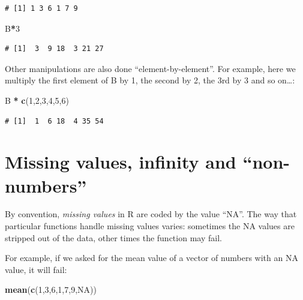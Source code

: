 \documentclass[
  a4paperpaper,
]{book}
\newenvironment{Shaded}{\begin{snugshade}}{\end{snugshade}}
\newcommand{\DecValTok}[1]{\textcolor[rgb]{0.00,0.00,0.81}{#1}}
\newcommand{\KeywordTok}[1]{\textcolor[rgb]{0.13,0.29,0.53}{\textbf{#1}}}
\newcommand{\NormalTok}[1]{#1}
\newcommand{\OperatorTok}[1]{\textcolor[rgb]{0.81,0.36,0.00}{\textbf{#1}}}
\newcommand{\OtherTok}[1]{\textcolor[rgb]{0.56,0.35,0.01}{#1}}
\newcommand{\StringTok}[1]{\textcolor[rgb]{0.31,0.60,0.02}{#1}}
\begin{document}
\begin{verbatim}
# [1] 1 3 6 1 7 9
\end{verbatim}

\begin{Shaded}
\begin{Highlighting}[]
\NormalTok{B}\OperatorTok{*}\DecValTok{3}
\end{Highlighting}
\end{Shaded}

\begin{verbatim}
# [1]  3  9 18  3 21 27
\end{verbatim}

Other manipulations are also done ``element-by-element''. For example, here we multiply the first element of B by 1, the second by 2, the 3rd by 3 and so on\ldots:

\begin{Shaded}
\begin{Highlighting}[]
\NormalTok{B }\OperatorTok{*}\StringTok{ }\KeywordTok{c}\NormalTok{(}\DecValTok{1}\NormalTok{,}\DecValTok{2}\NormalTok{,}\DecValTok{3}\NormalTok{,}\DecValTok{4}\NormalTok{,}\DecValTok{5}\NormalTok{,}\DecValTok{6}\NormalTok{)}
\end{Highlighting}
\end{Shaded}

\begin{verbatim}
# [1]  1  6 18  4 35 54
\end{verbatim}

\hypertarget{missing-values-infinity-and-non-numbers}{%
\section{Missing values, infinity and ``non-numbers''}\label{missing-values-infinity-and-non-numbers}}

By convention, \emph{missing values} in R are coded by the value ``NA''. The way that particular functions handle missing values varies: sometimes the NA values are stripped out of the data, other times the function may fail.

For example, if we asked for the mean value of a vector of numbers with an NA value, it will fail:

\begin{Shaded}
\begin{Highlighting}[]
\KeywordTok{mean}\NormalTok{(}\KeywordTok{c}\NormalTok{(}\DecValTok{1}\NormalTok{,}\DecValTok{3}\NormalTok{,}\DecValTok{6}\NormalTok{,}\DecValTok{1}\NormalTok{,}\DecValTok{7}\NormalTok{,}\DecValTok{9}\NormalTok{,}\OtherTok{NA}\NormalTok{))}
\end{Highlighting}
\end{Shaded}
\end{document}
